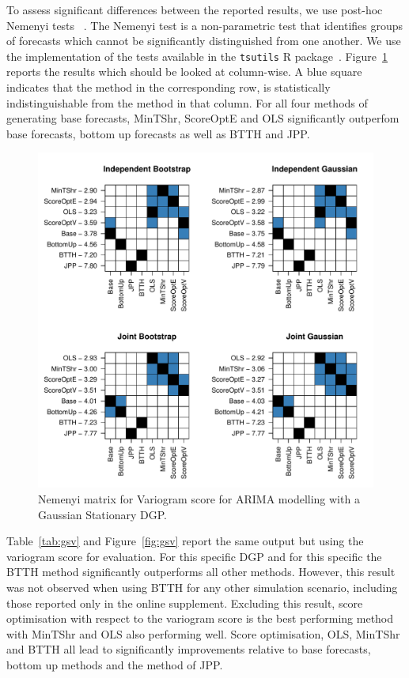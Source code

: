 \documentclass[12pt]{article}
\theoremstyle{definition}
\begin{document}
To assess significant differences between the reported results, we use post-hoc Nemenyi tests ~\citep{HolEtAl2013}. The Nemenyi test is a non-parametric test that identifies groups of forecasts which cannot be significantly distinguished from one another. We use the implementation of the tests available in the \verb|tsutils| R package~\citep{tsutilspackage}.  Figure~\ref{fig:gse} reports the results which should be looked at column-wise.  A blue square indicates that the method in the corresponding row, is statistically indistinguishable from the method in that column.  For all four methods of generating base forecasts, MinTShr, ScoreOptE and OLS significantly outperfom base forecasts, bottom up forecasts as well as BTTH and JPP.

\begin{figure}[H]
	\includegraphics[width=.95\textwidth]{Figs/gse.pdf}
	\caption{Nemenyi matrix for Variogram score for ARIMA 
		modelling with a Gaussian Stationary DGP.}
	\label{fig:gse}
\end{figure}

Table~\ref{tab:gsv} and Figure~\ref{fig:gsv} report the same output but using the variogram score for evaluation.  For this specific DGP and for this specific  the BTTH method significantly outperforms all other methods.  However, this result was not observed when using BTTH for any other simulation scenario, including those reported only in the online supplement.  Excluding this result, score optimisation with respect to the variogram score is the best performing method with MinTShr and OLS also performing well.  Score optimisation, OLS, MinTShr and BTTH all lead to significantly improvements relative to base forecasts, bottom up methods and the method of JPP.
\end{document}

